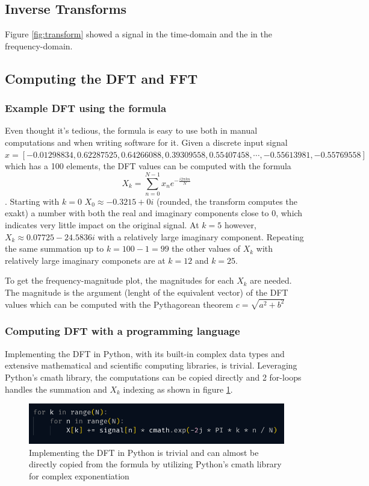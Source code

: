 \subsection{Inverse Transforms}
Figure \ref{fig:transform} showed a signal in the time-domain and the in the frequency-domain. 

\subsection{Computing the DFT and FFT}
\subsubsection{Example DFT using the formula}
Even thought it's tedious, the formula is easy to use both in manual computations and when writing software for it. Given a discrete input signal $x = [-0.01298834,  0.62287525,  0.64266088,  0.39309558,  0.55407458, \cdots , -0.55613981, -0.55769558]$ which has a 100 elements, the DFT values can be computed with the formula $$X_k = \sum_{n=0}^{N-1} x_ne^{-\frac{i2\pi kn}{N}}$$. Starting with $k=0$ $X_0 \approx -0.3215+0i$ (rounded, the transform computes the exakt) a number with both the real and imaginary components close to 0, which indicates very little impact on the original signal. At $k=5$ however, $X_k \approx 0.07725-24.5836i$ with a relatively large imaginary component. Repeating the same summation up to $k=100-1 = 99$ the other values of $X_k$ with relatively large imaginary componets are at $k=12$ and $k=25$. 

To get the frequency-magnitude plot, the magnitudes for each $X_k$ are needed. The magnitude is the argument (lenght of the equivalent vector) of the DFT values which can be computed with the Pythagorean theorem $c = \sqrt{a^2 + b^2}$ 
\subsubsection{Computing DFT with a programming language}
Implementing the DFT in Python, with its built-in complex data types and extensive mathematical and scientific computing libraries, is trivial. Leveraging Python's cmath library, the computations can be copied directly and 2 for-loops handles the summation and $X_k$ indexing as shown in figure \ref{fig:pyDFT}.

\begin{figure}[ht]
    \centering
    \includegraphics[width=\textwidth]{./images/pyDFT.png}
    \caption{Implementing the DFT in Python is trivial and can almost be directly copied from the formula by utilizing Python's cmath library for complex exponentiation \label{fig:pyDFT}}
\end{figure}

